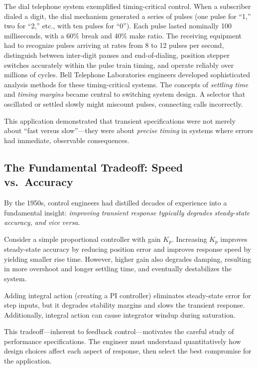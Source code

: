 The dial telephone system exemplified timing-critical control. When a subscriber dialed a digit, the dial mechanism generated a series of pulses (one pulse for ``1,'' two for ``2,'' etc., with ten pulses for ``0''). Each pulse lasted nominally 100 milliseconds, with a 60\% break and 40\% make ratio. The receiving equipment had to recognize pulses arriving at rates from 8 to 12 pulses per second, distinguish between inter-digit pauses and end-of-dialing, position stepper switches accurately within the pulse train timing, and operate reliably over millions of cycles. Bell Telephone Laboratories engineers developed sophisticated analysis methods for these timing-critical systems. The concepts of \textit{settling time} and \textit{timing margins} became central to switching system design. A selector that oscillated or settled slowly might miscount pulses, connecting calls incorrectly.

This application demonstrated that transient specifications were not merely about ``fast versus slow''---they were about \textit{precise timing} in systems where errors had immediate, observable consequences.

\subsection{The Fundamental Tradeoff: Speed vs.\ Accuracy}

By the 1950s, control engineers had distilled decades of experience into a fundamental insight: \textit{improving transient response typically degrades steady-state accuracy, and vice versa}.

Consider a simple proportional controller with gain $K_p$. Increasing $K_p$ improves steady-state accuracy by reducing position error and improves response speed by yielding smaller rise time. However, higher gain also degrades damping, resulting in more overshoot and longer settling time, and eventually destabilizes the system.

Adding integral action (creating a PI controller) eliminates steady-state error for step inputs, but it degrades stability margins and slows the transient response. Additionally, integral action can cause integrator windup during saturation.

This tradeoff---inherent to feedback control---motivates the careful study of performance specifications. The engineer must understand quantitatively how design choices affect each aspect of response, then select the best compromise for the application.

